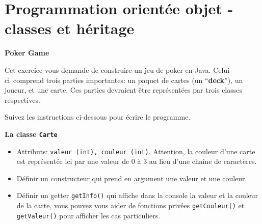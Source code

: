    


\section{Programmation orientée objet - classes et héritage}

\begin{Exercice}[15 minutes]\textbf{Poker Game}

    Cet exercice vous demande de construire un jeu de poker en Java. Celui-ci~comprend trois parties importantes: un paquet de cartes (un ``\textbf{deck}''), un joueur, et une carte. Ces parties devraient être représentées par trois classes respectives.
    
    Suivez les instructions ci-dessous pour écrire le programme.
    
    \textbf{La classe \lstinline{Carte}}
    \begin{itemize}
        \item Attributs: \lstinline{valeur (int), couleur (int)}. Attention, la couleur d'une carte est représentée ici par une valeur de 0 à 3 au lieu d'une chaîne de caractères.
        \item Définir un constructeur qui prend en argument une valeur et une couleur.
        \item Définir un getter \lstinline{getInfo()} qui affiche dans la console la valeur et la couleur de la carte, vous pouvez vous aider de fonctions privées
        \lstinline{getCouleur()} et \lstinline{getValeur()} pour afficher les cas particuliers.
    \end{itemize}
    
    
    

\end{Exercice}
